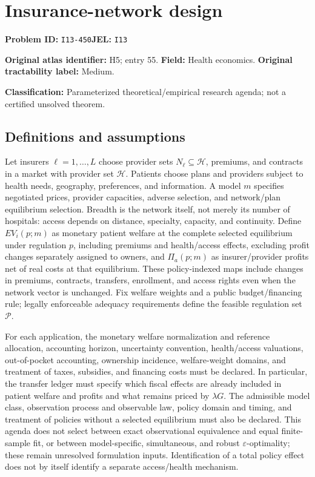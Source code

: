 \documentclass[11pt,a4paper]{article}
\begin{document}
\section*{Insurance-network design}
\textbf{Problem ID:} \texttt{I13-450}\quad \textbf{JEL:} \texttt{I13}\par
\label{problem:OP-0055}
\label{atlas:prob:H5}
\noindent\textbf{Original atlas identifier:} H5; entry 55. \textbf{Field:} Health economics. \textbf{Original tractability label:} Medium.

\noindent\textbf{Classification:} Parameterized theoretical/empirical research agenda; not a certified unsolved theorem.

\subsection*{Definitions and assumptions}
Let insurers $\ell=1,\ldots,L$ choose provider sets $N_\ell\subseteq\mathcal H$, premiums, and contracts in a market with provider set $\mathcal H$. Patients choose plans and providers subject to health needs, geography, preferences, and information. A model $m$ specifies negotiated prices, provider capacities, adverse selection, and network/plan equilibrium selection. Breadth is the network itself, not merely its number of hospitals: access depends on distance, specialty, capacity, and continuity. Define $EV_i(p;m)$ as monetary patient welfare at the complete selected equilibrium under regulation $p$, including premiums and health/access effects, excluding profit changes separately assigned to owners, and $\Pi_a(p;m)$ as insurer/provider profits net of real costs at that equilibrium. These policy-indexed maps include changes in premiums, contracts, transfers, enrollment, and access rights even when the network vector is unchanged. Fix welfare weights and a public budget/financing rule; legally enforceable adequacy requirements define the feasible regulation set $\mathcal P$.

For each application, the monetary welfare normalization and reference allocation, accounting horizon, uncertainty convention, health/access valuations, out-of-pocket accounting, ownership incidence, welfare-weight domains, and treatment of taxes, subsidies, and financing costs must be declared. In particular, the transfer ledger must specify which fiscal effects are already included in patient welfare and profits and what remains priced by $\lambda G$. The admissible model class, observation process and observable law, policy domain and timing, and treatment of policies without a selected equilibrium must also be declared. This agenda does not select between exact observational equivalence and equal finite-sample fit, or between model-specific, simultaneous, and robust $\varepsilon$-optimality; these remain unresolved formulation inputs. Identification of a total policy effect does not by itself identify a separate access/health mechanism.
\end{document}
